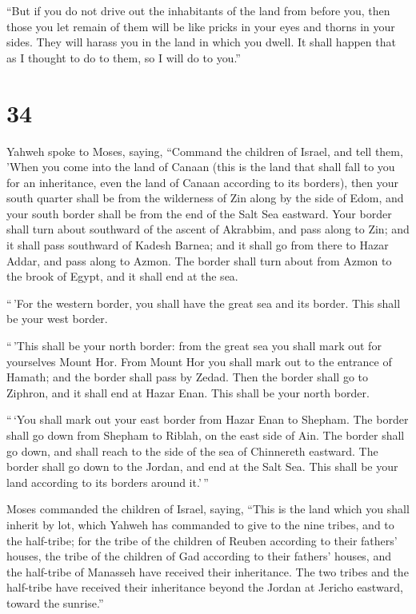  ``But if you do not drive out the inhabitants of the
land from before you, then those you let remain of them will be like
pricks in your eyes and thorns in your sides. They will harass you in
the land in which you dwell.  It shall happen that as I
thought to do to them, so I will do to you.''

\hypertarget{section-33}{%
\section{34}\label{section-33}}

 Yahweh spoke to Moses, saying,  ``Command
the children of Israel, and tell them, 'When you come into the land of
Canaan (this is the land that shall fall to you for an inheritance, even
the land of Canaan according to its borders),  then your
south quarter shall be from the wilderness of Zin along by the side of
Edom, and your south border shall be from the end of the Salt Sea
eastward.  Your border shall turn about southward of the
ascent of Akrabbim, and pass along to Zin; and it shall pass southward
of Kadesh Barnea; and it shall go from there to Hazar Addar, and pass
along to Azmon.  The border shall turn about from Azmon to
the brook of Egypt, and it shall end at the sea.

 ``\,'For the western border, you shall have the great sea
and its border. This shall be your west border.

 ``\,'This shall be your north border: from the great sea
you shall mark out for yourselves Mount Hor.  From Mount
Hor you shall mark out to the entrance of Hamath; and the border shall
pass by Zedad.  Then the border shall go to Ziphron, and
it shall end at Hazar Enan. This shall be your north border.

 ``\,`You shall mark out your east border from Hazar Enan
to Shepham.  The border shall go down from Shepham to
Riblah, on the east side of Ain. The border shall go down, and shall
reach to the side of the sea of Chinnereth eastward.  The
border shall go down to the Jordan, and end at the Salt Sea. This shall
be your land according to its borders around it.'\,''

 Moses commanded the children of Israel, saying, ``This
is the land which you shall inherit by lot, which Yahweh has commanded
to give to the nine tribes, and to the half-tribe;  for
the tribe of the children of Reuben according to their fathers' houses,
the tribe of the children of Gad according to their fathers' houses, and
the half-tribe of Manasseh have received their inheritance.
 The two tribes and the half-tribe have received their
inheritance beyond the Jordan at Jericho eastward, toward the sunrise.''

